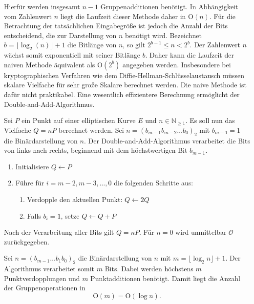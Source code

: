 Hierfür werden insgesamt $n-1$ Gruppenadditionen benötigt. In Abhängigkeit vom Zahlenwert $n$ liegt die Laufzeit dieser Methode daher in $\mathrm{O}(n)$. Für die Betrachtung der tatsächlichen Eingabegröße ist jedoch die Anzahl der Bits entscheidend, die zur Darstellung von $n$ benötigt wird. Bezeichnet \(b = \lfloor \log_2(n) \rfloor + 1\) die Bitlänge von $n$, so gilt \( 2^{b-1} \leq n < 2^b \). Der Zahlenwert $n$ wächst somit exponentiell mit seiner Bitlänge $b$. Daher kann die Laufzeit der naiven Methode äquivalent als \(\mathrm{O}(2^b)\) angegeben werden. Insbesondere bei kryptographischen Verfahren wie dem Diffie-Hellman-Schlüsselaustausch müssen skalare Vielfache für sehr große Skalare berechnet werden. Die naive Methode ist dafür nicht praktikabel. Eine wesentlich effizientere Berechnung ermöglicht der Double-and-Add-Algorithmus.
\begin{definition}
    Sei $P$ ein Punkt auf einer elliptischen Kurve $E$ und $n\in \mathbb{N}_{\geq 1}$. Es soll nun das Vielfache $Q=nP$ berechnet werden. Sei \( n = {(b_{m-1}b_{m-2}\dots b_0)}_2\) mit \(b_{m-1}=1\) die Binärdarstellung von $n$. Der Double-and-Add-Algorithmus verarbeitet die Bits von links nach rechts, beginnend mit dem höchstwertigen Bit $b_{m-1}$.
    \begin{enumerate}
        \item Initialisiere $Q\gets P$
        \item Führe für $i=m-2,m-3,\dots,0$ die folgenden Schritte aus:
              \begin{enumerate}
                  \item Verdopple den aktuellen Punkt: $Q\gets 2Q$
                  \item Falls $b_i=1$, setze $Q\gets Q+P$
              \end{enumerate}
    \end{enumerate}
    Nach der Verarbeitung aller Bits gilt $Q=nP$. Für $n=0$ wird unmittelbar $\mathcal{O}$ zurückgegeben.
\end{definition}
Sei \(n={(b_{m-1}\dots b_1b_0)}_2\) die Binärdarstellung von $n$ mit \(m=\lfloor\log_2 n\rfloor+1\). Der Algorithmus verarbeitet somit $m$ Bits. Dabei werden höchstens $m$ Punktverdopplungen und $m$  Punktadditionen benötigt. Damit liegt die Anzahl der Gruppenoperationen in
\[
    \mathrm{O}(m)=\mathrm{O}(\log n).
\]
